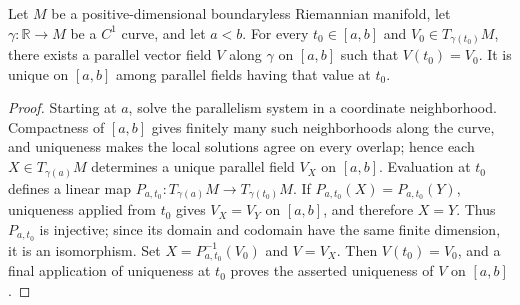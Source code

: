 \begin{proposition}
  \label{prop:dc-ch2-2-6-riemannian}
  \leanok
  Let $M$ be a positive-dimensional boundaryless Riemannian manifold, let
  $\gamma:\mathbb{R}\to M$ be a $C^1$ curve, and let $a<b$. For every
  $t_0\in[a,b]$ and $V_0\in T_{\gamma(t_0)}M$, there exists a parallel vector
  field $V$ along $\gamma$ on $[a,b]$ such that $V(t_0)=V_0$. It is unique on
  $[a,b]$ among parallel fields having that value at $t_0$.
\end{proposition}
\begin{proof}
  \leanok
  Starting at $a$, solve the parallelism system in a coordinate neighborhood.
  Compactness of $[a,b]$ gives finitely many such neighborhoods along the curve,
  and uniqueness makes the local solutions agree on every overlap; hence each
  $X\in T_{\gamma(a)}M$ determines a unique parallel field $V_X$ on $[a,b]$.
  Evaluation at $t_0$ defines a linear map
  $P_{a,t_0}:T_{\gamma(a)}M\to T_{\gamma(t_0)}M$. If
  $P_{a,t_0}(X)=P_{a,t_0}(Y)$, uniqueness applied from $t_0$ gives
  $V_X=V_Y$ on $[a,b]$, and therefore $X=Y$. Thus $P_{a,t_0}$ is injective;
  since its domain and codomain have the same finite dimension, it is an
  isomorphism. Set $X=P_{a,t_0}^{-1}(V_0)$ and $V=V_X$. Then
  $V(t_0)=V_0$, and a final application of uniqueness at $t_0$ proves the
  asserted uniqueness of $V$ on $[a,b]$.
\end{proof}
